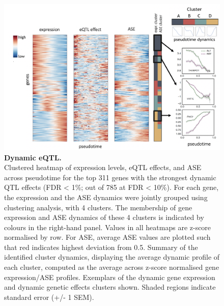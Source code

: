 \begin{figure}[htbp]
\centering
\includegraphics[width=15.5cm]{Chapter4/Fig/endodiff_pseudo_heatmap.png}
\caption[Dynamic eQTL]{\textbf{Dynamic eQTL.}\\
Clustered heatmap of expression levels, eQTL effects, and ASE across pseudotime for the top 311 genes with the strongest dynamic QTL effects (FDR < 1\%; out of 785 at FDR < 10\%). 
For each gene, the expression and the ASE dynamics were jointly grouped using clustering analysis, with 4 clusters. 
The membership of gene expression and ASE dynamics of these 4 clusters is indicated by colours in the right-hand panel. 
Values in all heatmaps are z-score normalised by row. 
For ASE, average ASE values are plotted such that red indicates highest deviation from 0.5.
Summary of the identified cluster dynamics, displaying the average dynamic profile
of each cluster, computed as the average across z-score normalised gene expression/ASE profiles. 
Exemplars of the dynamic gene expression and dynamic genetic effects clusters shown.
Shaded regions indicate standard error (+/- 1 SEM).}
\label{fig:endodiff_dynamic_eqtl}
\end{figure}



\newpage

